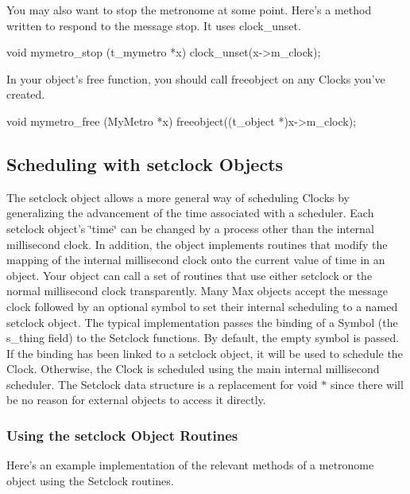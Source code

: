 You may also want to stop the metronome at some point. Here’s a method written to respond to the message stop. It uses clock\_\-unset.


\begin{DoxyCode}
    void mymetro_stop (t_mymetro *x) 
    { 
        clock_unset(x->m_clock); 
    }
\end{DoxyCode}


In your object’s free function, you should call freeobject on any Clocks you’ve created.


\begin{DoxyCode}
    void mymetro_free (MyMetro *x) 
    { 
        freeobject((t_object *)x->m_clock); 
    }
\end{DoxyCode}
\hypertarget{group__clocks_setclock}{}\subsection{Scheduling with setclock Objects}\label{group__clocks_setclock}
The setclock object allows a more general way of scheduling Clocks by generalizing the advancement of the time associated with a scheduler. Each setclock object’s \char`\"{}time\char`\"{} can be changed by a process other than the internal millisecond clock. In addition, the object implements routines that modify the mapping of the internal millisecond clock onto the current value of time in an object. Your object can call a set of routines that use either setclock or the normal millisecond clock transparently. Many Max objects accept the message clock followed by an optional symbol to set their internal scheduling to a named setclock object. The typical implementation passes the binding of a Symbol (the s\_\-thing field) to the Setclock functions. By default, the empty symbol is passed. If the binding has been linked to a setclock object, it will be used to schedule the Clock. Otherwise, the Clock is scheduled using the main internal millisecond scheduler. The Setclock data structure is a replacement for void $\ast$ since there will be no reason for external objects to access it directly.\hypertarget{group__clocks_setclock_using_the_routines}{}\subsubsection{Using the setclock Object Routines}\label{group__clocks_setclock_using_the_routines}
Here’s an example implementation of the relevant methods of a metronome object using the Setclock routines.


